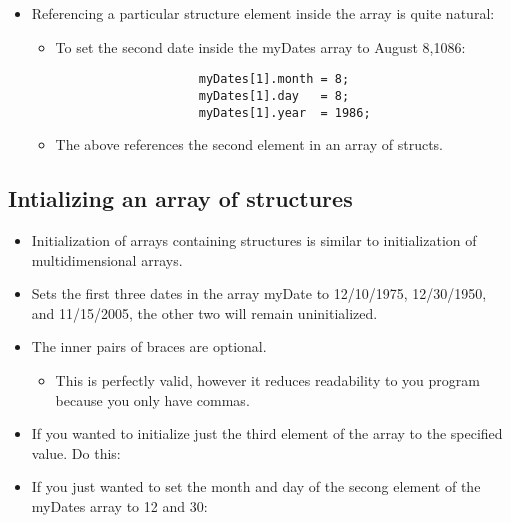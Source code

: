 \begin{itemize}
    \item Referencing a particular structure element inside the array is quite natural:
        \begin{itemize}
            \item To set the second date inside the myDates array to August 8,1086:
                \begin{verbatim}
                    myDates[1].month = 8;
                    myDates[1].day   = 8;
                    myDates[1].year  = 1986;
                \end{verbatim}
            
            \item The above references the second element in an array of structs. 
        \end{itemize}    
\end{itemize}

\subsection{Intializing an array of structures}
\begin{itemize}
    \item Initialization of arrays containing structures is similar to initialization of multidimensional arrays. 
    
    \item Sets the first three dates in the array myDate to 12/10/1975, 12/30/1950, and 11/15/2005, the other two will remain uninitialized. 
    \item The inner pairs of braces are optional. 
        \begin{itemize}
            \item This is perfectly valid, however it reduces readability to you program because you only have commas. 
        \end{itemize}
    \item If you wanted to initialize just the third element of the array to the specified value. Do this: 
    
    \item If you just wanted to set the month and day of the secong element of the myDates array to 12 and 30:
\end{itemize}

